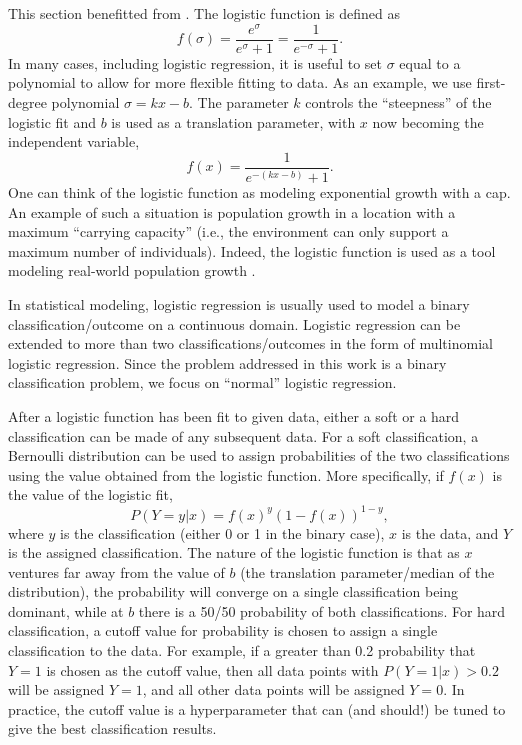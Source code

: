 This section benefitted from \cite{lrwiki}.  The logistic function is defined as
\begin{equation}
f(\sigma) = \frac{e^\sigma}{e^\sigma+1} = \frac{1}{e^{-\sigma}+1}.
\end{equation}
In many cases, including logistic regression, it is useful to set $\sigma$ equal to a polynomial to allow for more flexible fitting to data.  As an example, we use first-degree polynomial $\sigma = kx - b$.  The parameter $k$ controls the ``steepness'' of the logistic fit and $b$ is used as a translation parameter, with $x$ now becoming the independent variable,
\begin{equation}
f(x) = \frac{1}{e^{-(kx-b)} + 1}.
\end{equation}
One can think of the logistic function as modeling exponential growth with a cap.  An example of such a situation is population growth in a location with a maximum ``carrying capacity'' (i.e., the environment can only support a maximum number of individuals).  Indeed, the logistic function is used as a tool modeling real-world population growth \cite{populationgrowth}.

In statistical modeling, logistic regression is usually used to model a binary classification/outcome on a continuous domain.  Logistic regression can be extended to more than two classifications/outcomes in the form of multinomial logistic regression.  Since the problem addressed in this work is a binary classification problem, we focus on ``normal'' logistic regression.

After a logistic function has been fit to given data, either a soft or a hard classification can be made of any subsequent data.  For a soft classification, a Bernoulli distribution can be used to assign probabilities of the two classifications using the value obtained from the logistic function.  More specifically, if $f(x)$ is the value of the logistic fit,
\begin{equation}
P(Y=y | x) = f(x)^y(1-f(x))^{1-y},
\end{equation}
where $y$ is the classification (either 0 or 1 in the binary case), $x$ is the data, and $Y$ is the assigned classification.  The nature of the logistic function is that as $x$ ventures far away from the value of $b$ (the translation parameter/median of the distribution), the probability will converge on a single classification being dominant, while at $b$ there is a 50/50 probability of both classifications.  For hard classification, a cutoff value for probability is chosen to assign a single classification to the data.  For example, if a greater than 0.2 probability that $Y=1$ is chosen as the cutoff value, then all data points with $P(Y=1|x) > 0.2$ will be assigned $Y=1$, and all other data points will be assigned $Y=0$.  In practice, the cutoff value is a hyperparameter that can (and should!) be tuned to give the best classification results.